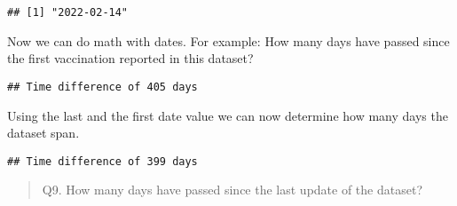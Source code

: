 \documentclass[
]{article}
\newenvironment{Shaded}{\begin{snugshade}}{\end{snugshade}}
\newcommand{\CommentTok}[1]{\textcolor[rgb]{0.56,0.35,0.01}{\textit{#1}}}
\newcommand{\DecValTok}[1]{\textcolor[rgb]{0.00,0.00,0.81}{#1}}
\newcommand{\FunctionTok}[1]{\textcolor[rgb]{0.00,0.00,0.00}{#1}}
\newcommand{\NormalTok}[1]{#1}
\newcommand{\OtherTok}[1]{\textcolor[rgb]{0.56,0.35,0.01}{#1}}
\newcommand{\SpecialCharTok}[1]{\textcolor[rgb]{0.00,0.00,0.00}{#1}}
\begin{document}
\begin{verbatim}
## [1] "2022-02-14"
\end{verbatim}

\begin{Shaded}
\end{Shaded}

Now we can do math with dates. For example: How many days have passed
since the first vaccination reported in this dataset?

\begin{Shaded}
\end{Shaded}

\begin{verbatim}
## Time difference of 405 days
\end{verbatim}

Using the last and the first date value we can now determine how many
days the dataset span.

\begin{Shaded}
\end{Shaded}

\begin{verbatim}
## Time difference of 399 days
\end{verbatim}

\begin{quote}
Q9. How many days have passed since the last update of the dataset?
\end{quote}

\begin{Shaded}
\end{Shaded}
\end{document}
